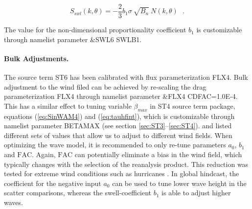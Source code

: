 \begin{equation}\label{eq:ST624}
  S_{swl}(k,\theta) = -\frac{2}{3}b_1 \sigma\ \sqrt{B_n}\ N(k,\theta) \:\:\:.
\end{equation}

\noindent
The value for the non-dimensional proportionality coefficient $b_1$ is
customizable through namelist parameter {\code \&SWL6 SWLB1}.

\noindent
\paragraph{Bulk Adjustments.} The source term
{\code ST6} has been calibrated with flux parameterization {\code FLX4}.
Bulk adjustment to the wind filed can be achieved by re-scaling the drag
parameterization {\code FLX4} through namelist parameter {\code
\&FLX4 CDFAC=1.0E-4}.  This has a similar effect to tuning variable
$\beta_{max}$ in {\code ST4} source term package, equations
(\ref{eq:SinWAM4}) and (\ref{eq:tauhfint}), which is customizable
through namelist parameter {\code BETAMAX} (see section
\ref{sec:ST3}--\ref{sec:ST4}). \citet{pro:Aea11} and \citet{art:RA13}
listed different sets of values that allow us to adjust to different
wind fields. When optimizing the wave model, it is recommended to
only re-tune parameters $a_0$, $b_1$ and $\mathrm{FAC}$. Again, $\mathrm{FAC}$
can potentially eliminate a bias in the wind field, which typically changes
with the selection of the reanalysis product. This reduction was tested
for extreme wind conditions such as hurricanes \citep{art:ZBRY13}.  In global
hindcast, the coefficient for the negative input $a_0$ can be used to tune
lower wave height in the scatter comparisons, whereas the swell-coefficient
$b_1$ is able to adjust higher waves.
